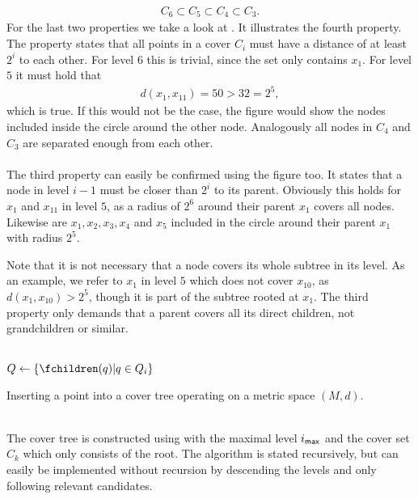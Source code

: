 	\begin{align*}
		C_6 \subset C_5 \subset C_4 \subset C_3.
	\end{align*}
	For the last two properties we take a look at . It illustrates the fourth property.
	The property states that all points in a cover $C_i$ must have a distance of at least $2^i$ to each other.
	For level $6$ this is trivial, since the set only contains $x_1$. For level $5$ it must hold that
	\begin{align*}
		d(x_1, x_{11}) = 50 > 32 = 2^5,
	\end{align*}
	which is true. If this would not be the case, the figure would show the nodes included inside the circle
	around the other node. Analogously all nodes in $C_4$ and $C_3$ are separated enough from each other.\\\\
	The third property can easily be confirmed using the figure too. It states that a node in level $i - 1$ must
	be closer than $2^i$ to its parent. Obviously this holds for $x_1$ and $x_{11}$ in level $5$, as a radius
	of $2^6$ around their parent $x_1$ covers all nodes. Likewise are $x_1, x_2, x_3, x_4$ and $x_5$ included
	in the circle around their parent $x_1$ with radius $2^5$.
	
	Note that it is not necessary that a node covers its whole subtree in its level. As an example, we refer to $x_1$ in level $5$
	which does not cover $x_{10}$, as $d(x_1, x_{10}) > 2^5$, though it is part of the subtree rooted at $x_1$.
	The third property only demands that a parent covers all its direct children, not grandchildren or similar.\\\\
	\IncMargin{1em}
	\begin{algorithm}
		\BlankLine
		\BlankLine
		$Q \leftarrow \{\fchildren(q) | q \in Q_i\}$\;
		\BlankLine
		\BlankLine
		\caption{Inserting a point into a cover tree operating on a metric space $(M, d)$.}\label{coverTreeInsert}
	\end{algorithm}\DecMargin{1em}\quad\\
	The cover tree is constructed using  with the maximal level $i_{\textsf{max}}$ and the cover
	set $C_k$ which only consists of the root. The algorithm is stated recursively, but can easily be implemented
	without recursion by descending the levels and only following relevant candidates.
	
